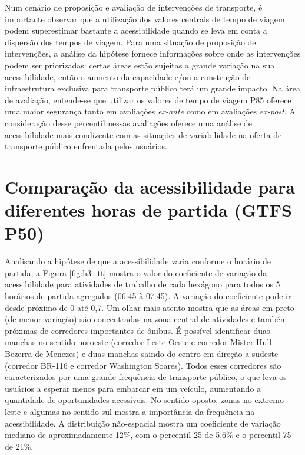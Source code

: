 \documentclass[        
    a4paper,          %
    12pt,             %
    chapter=TITLE,    %
    section=Title,    %
    subsection=Title, %
    oneside,          %
    english,          %
    spanish,          %
    brazil,           %
    fleqn             %
]{abntex2}
\begin{document}
  Num cenário de proposição e avaliação de intervenções de transporte, é importante observar que a utilização dos valores centrais de tempo de viagem podem superestimar bastante a acessibilidade quando se leva em conta a dispersão dos tempos de viagem. Para uma situação de proposição de intervenções, a análise da hipótese fornece informações sobre onde as intervenções podem ser priorizadas: certas áreas estão sujeitas a grande variação na sua acessibilidade, então o aumento da capacidade e/ou a construção de infraestrutura exclusiva para transporte público terá um grande impacto. Na área de avaliação, entende-se que utilizar os valores de tempo de viagem P85 oferece uma maior segurança tanto em avaliações \emph{ex-ante} como em avaliações \emph{ex-post}. A consideração desse percentil nessas avaliações oferece uma análise de acessibilidade mais condizente com as situações de variabilidade na oferta de transporte público enfrentada pelos usuários.
  
  \hypertarget{comparacao-da-acessibilidade-para-diferentes-horas-de-partida-gtfs-p50}{%
  \section{Comparação da acessibilidade para diferentes horas de partida (GTFS P50)}\label{comparacao-da-acessibilidade-para-diferentes-horas-de-partida-gtfs-p50}}
  
  Analisando a hipótese de que a acessibilidade varia conforme o horário de partida, a Figura \ref{fig:h3_tt} mostra o valor do coeficiente de variação da acessibilidade para atividades de trabalho de cada hexágono para todos os 5 horários de partida agregados (06:45 à 07:45). A variação do coeficiente pode ir desde próximo de 0 até 0,7. Um olhar mais atento mostra que as áreas em preto (de menor variação) são concentradas na zona central de atividades e também próximas de corredores importantes de ônibus. É possível identificar duas manchas no sentido noroeste (corredor Leste-Oeste e corredor Mister Hull-Bezerra de Menezes) e duas manchas saindo do centro em direção a sudeste (corredor BR-116 e corredor Washington Soares). Todos esses corredores são caracterizados por uma grande frequência de transporte público, o que leva os usuários a esperar menos para embarcar em um veículo, aumentando a quantidade de oportunidades acessíveis. No sentido oposto, zonas no extremo leste e algumas no sentido sul mostra a importância da frequência na acessibilidade. A distribuição não-espacial mostra um coeficiente de variação mediano de aproximadamente 12\%, com o percentil 25 de 5,6\% e o percentil 75 de 21\%.
  
\end{document}
